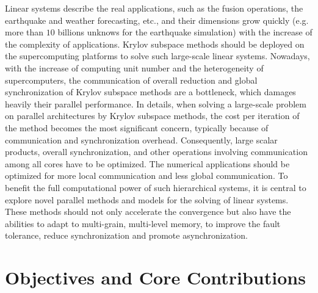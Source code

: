Linear systems describe the real applications, such as the fusion operations, the earthquake and weather forecasting, etc., and their dimensions grow quickly (e.g. more than $10$ billions unknows for the earthquake simulation) with the increase of the complexity of applications. Krylov subspace methods should be deployed on the supercomputing platforms to solve such large-scale linear systems. Nowadays, with the increase of computing unit number and the heterogeneity of supercomputers, the communication of overall reduction and global synchronization of Krylov subspace methods are a bottleneck, which damages heavily their parallel performance. In details, when solving a large-scale problem on parallel architectures by Krylov subspace methods, the cost per iteration of the method becomes the most significant concern, typically because of communication and synchronization overhead. Consequently, large scalar products, overall synchronization, and other operations involving communication among all cores have to be optimized. The numerical applications should be optimized for more local communication and less global communication. To benefit the full computational power of such hierarchical systems, it is central to explore novel parallel methods and models for the solving of linear systems. These methods should not only accelerate the convergence but also have the abilities to adapt to multi-grain, multi-level memory, to improve the fault tolerance, reduce synchronization and promote asynchronization.

\section{Objectives and Core Contributions}

